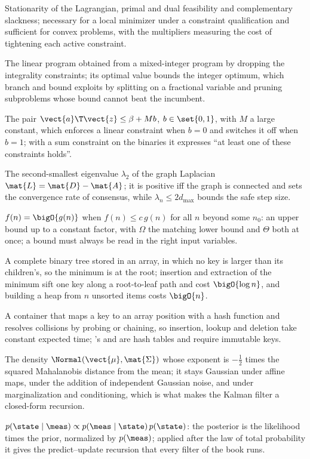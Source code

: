 \item[KKT conditions] Stationarity of the Lagrangian, primal and dual feasibility and complementary slackness; necessary for a local minimizer under a constraint qualification and sufficient for convex problems, with the multipliers measuring the cost of tightening each active constraint.
\item[LP relaxation] The linear program obtained from a mixed-integer program by dropping the integrality constraints; its optimal value bounds the integer optimum, which branch and bound exploits by splitting on a fractional variable and pruning subproblems whose bound cannot beat the incumbent.
\item[Big-M constraint] The pair $\vect{a}\T\vect{z}\le\beta+Mb$, $b\in\set{0,1}$, with $M$ a large constant, which enforces a linear constraint when $b=0$ and switches it off when $b=1$; with a sum constraint on the binaries it expresses ``at least one of these constraints holds''.
\item[Algebraic connectivity] The second-smallest eigenvalue $\lambda_2$ of the graph Laplacian $\mat{L}=\mat{D}-\mat{A}$; it is positive iff the graph is connected and sets the convergence rate of consensus, while $\lambda_n\le2d_{\max}$ bounds the safe step size.
\item[Big-O notation] $f(n)=\bigO{g(n)}$ when $f(n)\le c\,g(n)$ for all $n$ beyond some $n_0$: an upper bound up to a constant factor, with $\Omega$ the matching lower bound and $\Theta$ both at once; a bound must always be read in the right input variables.
\item[Binary heap] A complete binary tree stored in an array, in which no key is larger than its children's, so the minimum is at the root; insertion and extraction of the minimum sift one key along a root-to-leaf path and cost $\bigO{\log n}$, and building a heap from $n$ unsorted items costs $\bigO{n}$.
\item[Hash table] A container that maps a key to an array position with a hash function and resolves collisions by probing or chaining, so insertion, lookup and deletion take constant expected time; \python's  and  are hash tables and require immutable keys.
\item[Multivariate Gaussian] The density $\Normal(\vect{\mu},\mat{\Sigma})$ whose exponent is $-\tfrac12$ times the squared Mahalanobis distance from the mean; it stays Gaussian under affine maps, under the addition of independent Gaussian noise, and under marginalization and conditioning, which is what makes the Kalman filter a closed-form recursion.
\item[Bayes' rule] $p(\state\mid\meas)\propto p(\meas\mid\state)\,p(\state)$: the posterior is the likelihood times the prior, normalized by $p(\meas)$; applied after the law of total probability it gives the predict--update recursion that every filter of the book runs.
